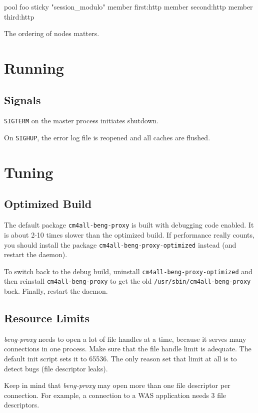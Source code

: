 \documentclass[a4paper,12pt]{article}
\begin{document}
\begin{verbatim*}
pool foo {
  sticky "session_modulo"
  member first:http
  member second:http
  member third:http
}
\end{verbatim*}

The ordering of nodes matters.

\section{Running}

\subsection{Signals}

\texttt{SIGTERM} on the master process initiates shutdown.

On \texttt{SIGHUP}, the error log file is reopened and all caches are
flushed.


\section{Tuning}

\subsection{Optimized Build}

The default package \texttt{cm4all-beng-proxy} is built with debugging
code enabled.  It is about 2-10 times slower than the optimized build.
If performance really counts, you should install the package
\texttt{cm4all\--beng\--proxy\--optimized} instead (and restart the
daemon).

To switch back to the debug build, uninstall
\texttt{cm4all\--beng\--proxy\--op\-ti\-mi\-zed} and then reinstall
\texttt{cm4all\--beng\--proxy} to get the old
\texttt{/usr/sbin/cm4all\--beng\--proxy} back.  Finally, restart the
daemon.

\subsection{Resource Limits}

\emph{beng-proxy} needs to open a lot of file handles at a time,
because it serves many connections in one process.  Make sure that the
file handle limit is adequate.  The default init script sets it to
65536.  The only reason set that limit at all is to detect bugs (file
descriptor leaks).

Keep in mind that \emph{beng-proxy} may open more than one file
descriptor per connection.  For example, a connection to a WAS
application needs 3 file descriptors.
\end{document}

